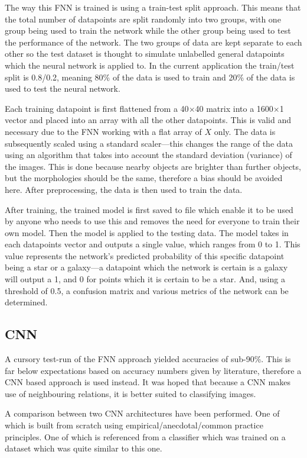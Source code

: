 \documentclass[a4paper,fleqn,usenatbib]{mnras}
\begin{document}
The way this FNN is trained is using a train-test split approach. This means that the total number of datapoints are split randomly into two groups, with one group being used to train the network while the other group being used to test the performance of the network. The two groups of data are kept separate to each other so the test dataset is thought to simulate unlabelled general datapoints which the neural network is applied to. In the current application the train/test split is 0.8/0.2, meaning 80\% of the data is used to train and 20\% of the data is used to test the neural network. 

Each training datapoint is first flattened from a 40$\times$40 matrix into a 1600$\times$1 vector and placed into an array with all the other datapoints. This is valid and necessary due to the FNN working with a flat array of $X$ only. \citep{Flatten} The data is subsequently scaled using a standard scaler---this changes the range of the data using an algorithm that takes into account the standard deviation (variance) of the images. This is done because nearby objects are brighter than further objects, but the morphologies should be the same, therefore a bias should be avoided here. After preprocessing, the data is then used to train the data. 

After training, the trained model is first saved to file which enable it to be used by anyone who needs to use this and removes the need for everyone to train their own model. Then the model is applied to the testing data. The model takes in each datapoints vector and outputs a single value, which ranges from 0 to 1. This value represents the network's predicted probability of this specific datapoint being a star or a galaxy---a datapoint which the network is certain is a galaxy will output a 1, and 0 for points which it is certain to be a star. And, using a threshold of 0.5, a confusion matrix and various metrics of the network can be determined. 
\subsection{CNN}
A cursory test-run of the FNN approach yielded accuracies of sub-90\%. This is far below expectations based on accuracy numbers given by literature, therefore a CNN based approach is used instead. It was hoped that because a CNN makes use of neighbouring relations, it is better suited to classifying images. 

A comparison between two CNN architectures have been performed. One of which is built from scratch using empirical/anecdotal/common practice principles. One of which is referenced from a classifier which was trained on a dataset which was quite similar to this one. 
\end{document}
